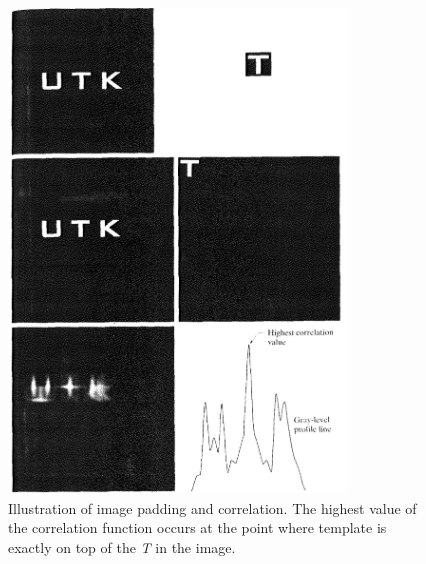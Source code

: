 \begin{figure}[!h]\centering
	\includegraphics[width=0.8\textwidth]{figure_2_1.PNG}
	\caption{Illustration of image padding and correlation. The highest value of the correlation function occurs at the point where template is exactly on top of the \textit{T} in the image.}
	\label{pl1}
\end{figure}

